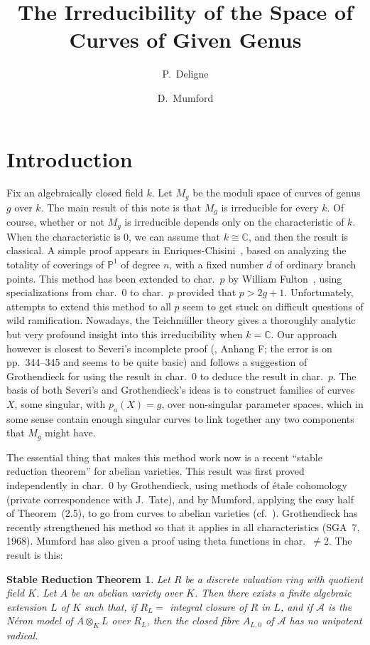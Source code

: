 \documentclass[10pt]{amsart}
\title{The Irreducibility of the Space of Curves of Given Genus}
\author{P.~Deligne}
\author{D.~Mumford}
\date{}
\theoremstyle{plain}
\newtheorem*{stheorem}{Stable Reduction Theorem}
\theoremstyle{definition}
\begin{document}
\maketitle

\section*{Introduction}

Fix an algebraically closed field $k$. Let $M_g$ be the moduli space of curves of genus $g$ over $k$. The main result of this note is that $M_g$ is irreducible for every $k$. Of course, whether or not $M_g$ is irreducible depends only on the characteristic of $k$. When the characteristic is $0$, we can assume that $k \cong \mathbb{C}$, and then the result is classical. A simple proof appears in Enriques-Chisini~\cite{E}, based on analyzing the totality of coverings of $\mathbb{P}^1$ of degree $n$, with a fixed number $d$ of ordinary branch points. This method has been extended to char.~$p$ by William Fulton~\cite{F}, using specializations from char.~$0$ to char.~$p$ provided that $p > 2g+1$. Unfortunately, attempts to extend this method to all $p$ seem to get stuck on difficult questions of wild ramification. Nowadays, the Teichm\"uller theory gives a thoroughly analytic but very profound insight into this irreducibility when $k = \mathbb{C}$. Our approach however is closest to Severi's incomplete proof (\cite{Se}, Anhang F; the error is on pp.~344--345 and seems to be quite basic) and follows a suggestion of Grothendieck for using the result in char.~$0$ to deduce the result in char.~$p$. The basis of both Severi's and Grothendieck's ideas is to construct families of curves $X$, some singular, with $p_a(X) = g$, over non-singular parameter spaces, which in some sense contain enough singular curves to link together any two components that $M_g$ might have.

The essential thing that makes this method work now is a recent ``stable reduction theorem'' for abelian varieties. This result was first proved independently in char.~$0$ by Grothendieck, using methods of \'etale cohomology (private correspondence with J.~Tate), and by Mumford, applying the easy half of Theorem~(2.5), to go from curves to abelian varieties (cf.~\cite{M2}). Grothendieck has recently strengthened his method so that it applies in all characteristics (SGA~7, 1968). Mumford has also given a proof using theta functions in char.~$\neq 2$. The result is this:

\begin{stheorem}
Let $R$ be a discrete valuation ring with quotient field $K$. Let $A$ be an abelian variety over $K$. Then there exists a finite algebraic extension $L$ of $K$ such that, if $R_L =$ integral closure of $R$ in $L$, and if $\mathscr{A}$ is the N\'eron model of $A \otimes_K L$ over $R_L$, then the closed fibre $A_{L,0}$ of $\mathscr{A}$ has no unipotent radical.
\end{stheorem}
\end{document}
